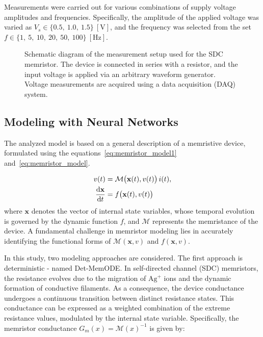 \documentclass[11pt, oneside]{article}
\newcommand{\der}{{\rm d}}
\newcommand{\M}{\mathcal{M}}
\newcommand{\ua}{v}
\newcommand{\ia}{i}
\begin{document}
Measurements were carried out for various combinations of supply voltage amplitudes and frequencies. Specifically, the amplitude of the applied voltage was varied as $V_s \in \{0.5,\ 1.0,\ 1.5\}~\mathrm{[V]}$, and the frequency was selected from the set $f \in \{1,\ 5,\ 10,\ 20,\ 50,\ 100\}~\mathrm{[Hz]}$.


\begin{figure}[H]
    \centering
    \resizebox{0.5\linewidth}{!}{%
        }
    \vspace{-0.5in}
    \caption{Schematic diagram of the measurement setup used for the SDC memristor. The device is connected in series with a resistor, and the input voltage is applied via an arbitrary waveform generator. Voltage measurements are acquired using a data acquisition (DAQ) system.}
    \label{fig:memristor_setup}
\end{figure}

\subsection{Modeling with Neural Networks}
The analyzed model is based on a general description of a memristive device, formulated using the equations~\eqref{eq:memristor_model1} and~\eqref{eq:memristor_model}.


\newcommand{\xvec}{\mathbf{x}}
\begin{align}
    \label{eq:memristor_model1}
    \ua(t)                    & = \M \big(\xvec(t),\ua(t)\big) \, \ia(t), \\
    \label{eq:memristor_model}
    \frac{\der \xvec}{\der t} & = f\big(\xvec(t),\ua(t)\big)
\end{align}
where $\xvec$ denotes the vector of internal state variables, whose temporal evolution is governed by the dynamic function $f$, and $\M$ represents the memristance of the device. A fundamental challenge in memristor modeling lies in accurately identifying the functional forms of $\M(\xvec,\ua)$ and $f(\xvec,\ua)$.

In this study, two modeling approaches are considered.
The first approach is deterministic - named Det-MemODE. In self-directed channel (SDC) memristors, the resistance evolves due to the migration of $\mathrm{Ag^+}$ ions and the dynamic formation of conductive filaments. As a consequence, the device conductance undergoes a continuous transition between distinct resistance states. This conductance can be expressed as a weighted combination of the extreme resistance values, modulated by the internal state variable. Specifically, the memristor conductance $G_m(x) = \M(x)^{-1}$ is given by:
\end{document}
